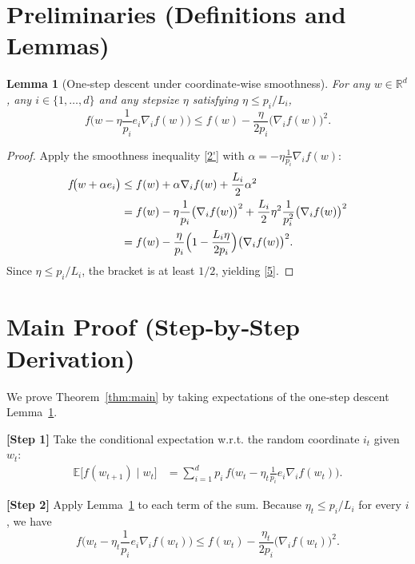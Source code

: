 \documentclass{article}
\newcommand{\E}{\mathbb{E}}
\newcommand{\R}{\mathbb{R}}
\newtheorem{lemma}{Lemma}
\begin{document}
\newpage

\section*{Preliminaries (Definitions and Lemmas)}
\begin{lemma}[One‑step descent under coordinate‑wise smoothness]\label{lem:descent}
For any $w\in\R^{d}$, any $i\in\{1,\dots,d\}$ and any stepsize $\eta$ satisfying
$\eta\le p_{i}/L_{i}$,
\[
f\!\bigl(w-\eta\frac{1}{p_{i}}e_{i}\nabla_{i}f(w)\bigr)
\le f(w)-\frac{\eta}{2p_{i}}\bigl(\nabla_{i}f(w)\bigr)^{2}.
\tag{5}
\]
\end{lemma}
\begin{proof}
Apply the smoothness inequality \eqref{2'} with $\alpha=-\eta\frac{1}{p_{i}}\nabla_{i}f(w)$:
\[
\begin{aligned}
f\!\bigl(w+\alpha e_{i}\bigr)
&\le f(w)+\alpha\nabla_{i}f(w)+\frac{L_{i}}{2}\alpha^{2}\\
&= f(w)-\eta\frac{1}{p_{i}}\bigl(\nabla_{i}f(w)\bigr)^{2}
       +\frac{L_{i}}{2}\eta^{2}\frac{1}{p_{i}^{2}}\bigl(\nabla_{i}f(w)\bigr)^{2}\\
&= f(w)-\frac{\eta}{p_{i}}\Bigl(1-\frac{L_{i}\eta}{2p_{i}}\Bigr)
       \bigl(\nabla_{i}f(w)\bigr)^{2}.
\end{aligned}
\]
Since $\eta\le p_{i}/L_{i}$, the bracket is at least $1/2$, yielding \eqref{5}.
\end{proof}

\section*{Main Proof (Step‑by‑Step Derivation)}
We prove Theorem~\ref{thm:main} by taking expectations of the one‑step
descent Lemma~\ref{lem:descent}.

\noindent\textbf{[Step 1]} Take the conditional expectation w.r.t. the random
coordinate $i_{t}$ given $w_{t}$:
\[
\begin{aligned}
\E\!\bigl[f(w_{t+1})\mid w_{t}\bigr]
&= \sum_{i=1}^{d}p_{i}\,
   f\!\bigl(w_{t}-\eta_{t}\frac{1}{p_{i}}e_{i}\nabla_{i}f(w_{t})\bigr) .
\end{aligned}
\tag{6}
\]

\noindent\textbf{[Step 2]} Apply Lemma~\ref{lem:descent} to each term of the sum.
Because $\eta_{t}\le p_{i}/L_{i}$ for every $i$, we have
\[
f\!\bigl(w_{t}-\eta_{t}\frac{1}{p_{i}}e_{i}\nabla_{i}f(w_{t})\bigr)
\le f(w_{t})-\frac{\eta_{t}}{2p_{i}}\bigl(\nabla_{i}f(w_{t})\bigr)^{2}.
\tag{7}
\]
\end{document}
